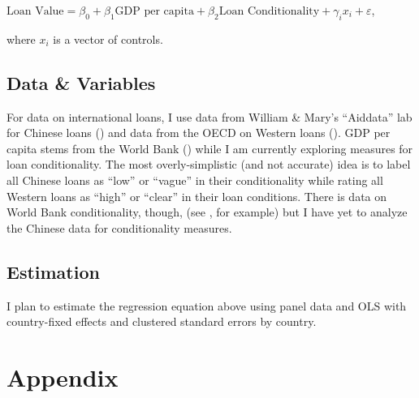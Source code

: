 $\text{Loan Value}= \beta_0 + \beta_1 \text{GDP per capita}+ \beta_2 \text{Loan Conditionality}+ \gamma_i x_i + \varepsilon$,

where $x_i$ is a vector of controls.

\subsection*{Data \& Variables}
For data on international loans, I use data from William \& Mary's ``Aiddata'' lab for Chinese loans (\cite{custer2021}) and data from the OECD on Western loans (\cite{oecd2022}). GDP per capita stems from the World Bank (\cite{bank2022}) while I am currently exploring measures for loan conditionality. The most overly-simplistic (and not accurate) idea is to label all Chinese loans as ``low'' or ``vague'' in their conditionality while rating all Western loans as ``high'' or ``clear'' in their loan conditions. There is data on World Bank conditionality, though, (see \cite{hernandez2017}, for example) but I have yet to analyze the Chinese data for conditionality measures.

\subsection*{Estimation}
I plan to estimate the regression equation above using panel data and OLS with country-fixed effects and clustered standard errors by country.

\pagebreak
\section*{Appendix}
